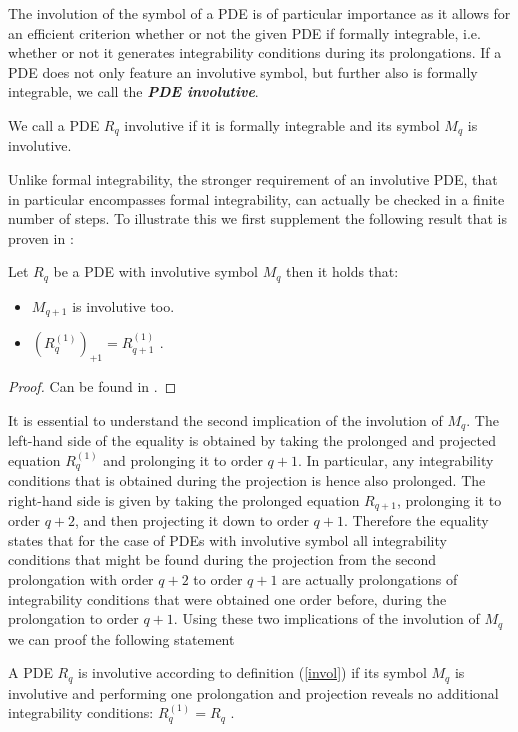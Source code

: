 The involution of the symbol of a PDE is of particular importance as it allows for an efficient criterion whether or not the given PDE if formally integrable, i.e. whether or not it generates integrability conditions during its prolongations.
If a PDE does not only feature an involutive symbol, but further also is formally integrable, we call the \textit{\textbf{PDE involutive}}.
\begin{definition} \label{invol}
We call a PDE $R_q$ involutive if it is formally integrable and its symbol $M_q$ is involutive.
\end{definition}
Unlike formal integrability, the stronger requirement of an involutive PDE, that in particular encompasses formal integrability, can actually be checked in a finite number of steps.
To illustrate this we first supplement the following result that is proven in \cite{seiler1994analysis}:
\begin{theorem}\label{invoCons}
Let $R_q$ be a PDE with involutive symbol $M_q$ then it holds that:
\begin{itemize}
    \item $M_{q+1}$ is involutive too.
    \item $(R_{q}^{(1)})_{+1} = R_{q+1}^{(1)}$ .
\end{itemize}
\end{theorem}
\begin{proof}
Can be found in \cite{seiler1994analysis}.
\end{proof}
It is essential to understand the second implication of the involution of $M_q$. The left-hand side of the equality is obtained by taking the prolonged and projected equation $R_q^{(1)}$ and prolonging it to order $q+1$. In particular, any integrability conditions that is obtained during the projection is hence also prolonged. The right-hand side is given by taking the prolonged equation $R_{q+1}$, prolonging it to order $q+2$, and then projecting it down to order $q+1$. Therefore the equality states that for the case of PDEs with involutive symbol all integrability conditions that might be found during the projection from the second prolongation with order $q+2$ to order $q+1$ are actually prolongations of integrability conditions that were obtained one order before, during the prolongation to order $q+1$.
Using these two implications of the involution of $M_q$ we can proof the following statement
\begin{theorem}
A PDE $R_q$ is involutive according to definition (\ref{invol}) if its symbol $M_q$ is involutive and performing one prolongation and projection reveals no additional integrability conditions: $R_q^{(1)} = R_q$ .
\end{theorem}
